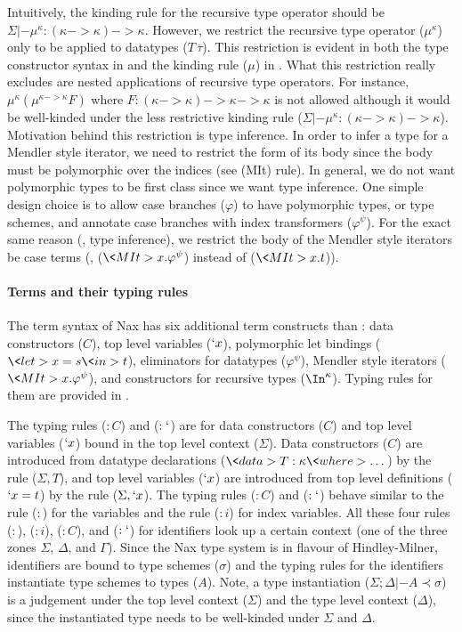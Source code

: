 Intuitively, the kinding rule for the recursive type operator should be
$\Sigma |- \mu^\kappa : (\kappa -> \kappa) -> \kappa$. However, we restrict
the recursive type operator ($\mu^\kappa$) only to be applied to datatypes
($T\,\overline{\tau}$). This restriction is evident in both
the type constructor syntax in 
and the kinding rule ($\mu$) in . What this restriction
really excludes are nested applications of recursive type operators.
For instance, $\mu^\kappa(\mu^{\kappa -> \kappa} F)$ where
$F:(\kappa -> \kappa) -> \kappa -> \kappa$ is not allowed
although it would be well-kinded under the less restrictive kinding rule
($\Sigma |- \mu^\kappa : (\kappa -> \kappa) -> \kappa$).
Motivation behind this restriction is type inference.
In order to infer a type for a Mendler style iterator, we need to restrict
the form of its body since the body must be polymorphic over the indices
(see (MIt) rule). In general, we do not want polymorphic types to be first
class since we want type inference. One simple design choice is to allow
case branches ($\varphi$) to have polymorphic types, or type schemes, and
annotate case branches with index transformers ($\varphi^\psi$). For the
exact same reason (\ie, type inference), we restrict the body of the
Mendler style iterators be case terms (\ie, ($\<MIt> x.\varphi^\psi$)
instead of ($\<MIt> x.t$)).

\paragraph{Terms and their typing rules}
The term syntax of Nax has six additional term constructs than \Fi:
data constructors ($C$), top level variables ($`x$),
polymorphic let bindings ($\<let> x=s \<in> t$),
eliminators for datatypes ($\varphi^\psi$),
Mendler style iterators ($\<MIt>x.\varphi^\psi$), and
constructors for recursive types ($\In^\kappa$).
Typing rules for them are provided in .

The typing rules ($:C$) and ($:`$) are for data constructors ($C$)
and top level variables ($`x$) bound in the top level context ($\Sigma$).
Data constructors ($C$) are introduced from datatype declarations
($\<data> T:\kappa \<where> \dots$) by the rule ($\Sigma,T$), and
top level variables ($`x$) are introduced from top level definitions
($`x=t$) by the rule ($\Sigma,`x$).
The typing rules ($:C$) and ($:`$) behave similar to the rule ($:$)
for the variables and the rule ($:i$) for index variables.
All these four rules ($:$), ($:i$), ($:C$), and ($:`$) for
identifiers look up a certain context (one of the three zones $\Sigma$,
$\Delta$, and $\Gamma$). Since the Nax type system is in flavour of
Hindley-Milner, identifiers are bound to type schemes ($\sigma$) and
the typing rules for the identifiers instantiate type schemes to types ($A$).
Note, a type instantiation ($\Sigma;\Delta |- A\prec\sigma$) is a judgement
under the top level context ($\Sigma$) and the type level context ($\Delta$),
since the instantiated type needs to be well-kinded under
$\Sigma$ and $\Delta$.

